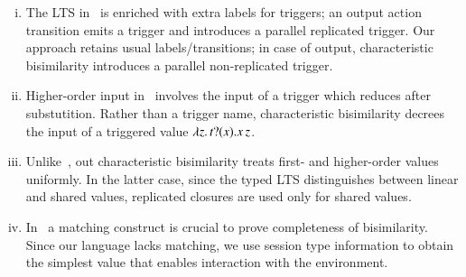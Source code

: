 \begin{enumerate}[i.]
\item 
The LTS in~\cite{JeffreyR05} is enriched with extra labels for triggers;
an output action transition emits a trigger and introduces a parallel replicated trigger.
Our 
approach retains usual labels/transitions; in  case of output,
characteristic bisimilarity introduces a parallel
non-replicated trigger.
\item Higher-order input in~\cite{JeffreyR05} involves 
the input of a trigger which reduces after substutition.
Rather than a trigger name, characteristic bisimilarity 
decrees the input of a triggered value $\lambda z.\,t ? (x) . x\, {z}$.
\item Unlike~\cite{JeffreyR05}, 
out characteristic bisimilarity treats  
first- and higher-order values uniformly. In the latter case, 
since the typed LTS distinguishes between linear and shared values, 
replicated closures are used only for shared values.

\item In~\cite{JeffreyR05}  a matching construct 
is crucial to prove completeness of bisimilarity.
Since our language lacks matching,
we use session type information to obtain the simplest value that 
enables interaction with the environment.


\end{enumerate}

